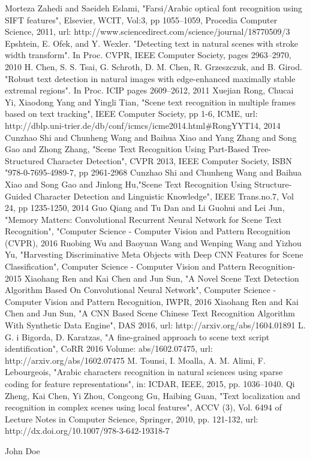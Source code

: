 \documentclass[conference]{IEEEtran}
\begin{document}
\begin{thebibliography}{1}
Morteza Zahedi and Saeideh Eslami, "Farsi/Arabic optical font recognition using {SIFT} features", Elsevier, WCIT, Vol:3, pp 1055--1059, Procedia Computer Science, 2011, url: http://www.sciencedirect.com/science/journal/18770509/3
Epshtein, E. Ofek, and Y. Wexler. "Detecting text in natural scenes with stroke width transform". In Proc. CVPR, IEEE Computer Society, pages 2963–2970, 2010
H. Chen, S. S. Tsai, G. Schroth, D. M. Chen, R. Grzeszczuk, and B. Girod. "Robust text detection in natural images with edge-enhanced maximally stable extremal regions". In Proc. ICIP pages 2609–2612, 2011
Xuejian Rong, Chucai Yi, Xiaodong Yang and Yingli Tian, "Scene text recognition in multiple frames based on text tracking",  IEEE Computer Society, pp 1-6, ICME, url: http://dblp.uni-trier.de/db/conf/icmcs/icme2014.html\#RongYYT14, 2014
Cunzhao Shi and Chunheng Wang and Baihua Xiao and Yang Zhang and Song Gao and Zhong Zhang, "Scene Text Recognition Using Part-Based Tree-Structured Character Detection", CVPR 2013, IEEE Computer Society, ISBN "978-0-7695-4989-7, pp 2961-2968
Cunzhao Shi and Chunheng Wang and Baihua Xiao and Song Gao and Jinlong Hu,"Scene Text Recognition Using Structure-Guided	Character Detection and Linguistic Knowledge", IEEE Trans.no.7, Vol 24, pp 1235-1250, 2014
Guo Qiang and Tu Dan and Li Guohui and Lei Jun, "Memory Matters: Convolutional Recurrent Neural Network for Scene Text Recognition", "Computer Science - Computer Vision and Pattern Recognition (CVPR), 2016
Ruobing Wu and Baoyuan Wang and Wenping Wang and Yizhou Yu, "Harvesting Discriminative Meta Objects with Deep {CNN} Features for Scene Classification", Computer Science - Computer Vision and Pattern Recognition- 2015
Xiaohang Ren and Kai Chen and Jun Sun, "A Novel Scene Text Detection Algorithm Based On Convolutional Neural Network", Computer Science - Computer Vision and Pattern Recognition, IWPR, 2016
Xiaohang Ren and Kai Chen and Jun Sun, "A {CNN} Based Scene Chinese Text Recognition Algorithm With Synthetic Data Engine", DAS 2016, url: http://arxiv.org/abs/1604.01891
L. G. i Bigorda, D. Karatzas, "A fine-grained approach to scene text script identification", CoRR 2016 Volume: abs/1602.07475, url: http://arxiv.org/abs/1602.07475
M. Tounsi, I. Moalla, A. M. Alimi, F. Lebourgeois, "Arabic characters recognition in natural sciences using sparse coding for feature representations", in: ICDAR, IEEE, 2015, pp. 1036–1040.
Qi Zheng, Kai Chen, Yi Zhou, Congcong Gu, Haibing Guan, "Text localization and recognition in complex scenes using local features", ACCV (3), Vol. 6494 of Lecture Notes in Computer Science, Springer, 2010, pp. 121-132, url: http://dx.doi.org/10.1007/978-3-642-19318-7
\end{thebibliography}


\begin{IEEEbiography}{John Doe}
\blindtext
\end{IEEEbiography}
\end{document}
